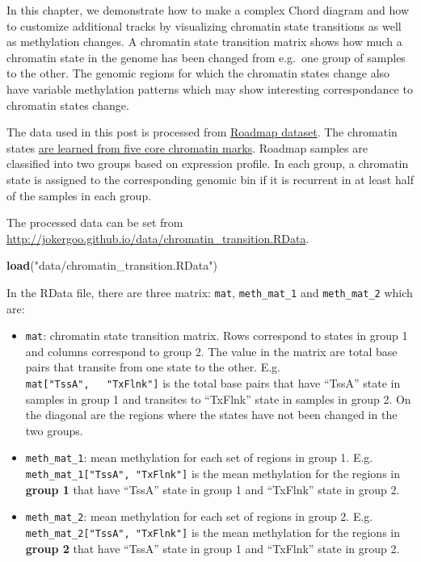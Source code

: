 \documentclass[]{book}
\newenvironment{Shaded}{\begin{snugshade}}{\end{snugshade}}
\newcommand{\KeywordTok}[1]{\textcolor[rgb]{0.13,0.29,0.53}{\textbf{#1}}}
\newcommand{\StringTok}[1]{\textcolor[rgb]{0.31,0.60,0.02}{#1}}
\newcommand{\NormalTok}[1]{#1}
\providecommand{\tightlist}{%
  \setlength{\itemsep}{0pt}\setlength{\parskip}{0pt}}
\theoremstyle{definition}
\theoremstyle{definition}
\theoremstyle{remark}
\begin{document}
In this chapter, we demonstrate how to make a complex Chord diagram and
how to customize additional tracks by visualizing chromatin state
transitions as well as methylation changes. A chromatin state transition
matrix shows how much a chromatin state in the genome has been changed
from e.g.~one group of samples to the other. The genomic regions for
which the chromatin states change also have variable methylation
patterns which may show interesting correspondance to chromatin states
change.

The data used in this post is processed from
\href{http://www.roadmapepigenomics.org/}{Roadmap dataset}. The
chromatin states
\href{http://egg2.wustl.edu/roadmap/web_portal/chr_s\%20tate_learning.html\#core_15state}{are
learned from five core chromatin marks}. Roadmap samples are classified
into two groups based on expression profile. In each group, a chromatin
state is assigned to the corresponding genomic bin if it is recurrent in
at least half of the samples in each group.

The processed data can be set from
\url{http://jokergoo.github.io/data/chromatin_transition.RData}.

\begin{Shaded}
\begin{Highlighting}[]
\KeywordTok{load}\NormalTok{(}\StringTok{"data/chromatin_transition.RData"}\NormalTok{)}
\end{Highlighting}
\end{Shaded}

In the RData file, there are three matrix: \texttt{mat},
\texttt{meth\_mat\_1} and \texttt{meth\_mat\_2} which are:

\begin{itemize}
\tightlist
\item
  \texttt{mat}: chromatin state transition matrix. Rows correspond to
  states in group 1 and columns correspond to group 2. The value in the
  matrix are total base pairs that transite from one state to the other.
  E.g. \texttt{mat{[}"TssA",\ \ \ "TxFlnk"{]}} is the total base pairs
  that have ``TssA'' state in samples in group 1 and transites to
  ``TxFlnk'' state in samples in group 2. On the diagonal are the
  regions where the states have not been changed in the two groups.
\item
  \texttt{meth\_mat\_1}: mean methylation for each set of regions in
  group 1. E.g. \texttt{meth\_mat\_1{[}"TssA",\ "TxFlnk"{]}} is the mean
  methylation for the regions in \textbf{group 1} that have ``TssA''
  state in group 1 and ``TxFlnk'' state in group 2.
\item
  \texttt{meth\_mat\_2}: mean methylation for each set of regions in
  group 2. E.g. \texttt{meth\_mat\_2{[}"TssA",\ "TxFlnk"{]}} is the mean
  methylation for the regions in \textbf{group 2} that have ``TssA''
  state in group 1 and ``TxFlnk'' state in group 2.
\end{itemize}
\end{document}
